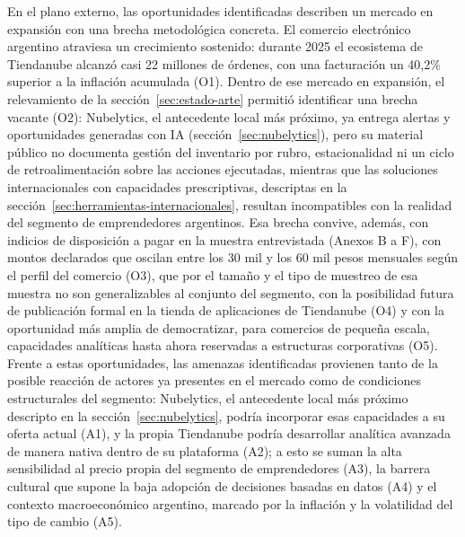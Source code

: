 En el plano externo, las oportunidades identificadas describen un mercado en expansión con una brecha metodológica concreta. El comercio electrónico argentino atraviesa un crecimiento sostenido: durante 2025 el ecosistema de Tiendanube alcanzó casi 22 millones de órdenes, con una facturación un 40,2\% superior a la inflación acumulada \parencite{Tiendanube2026} (O1). Dentro de ese mercado en expansión, el relevamiento de la sección~\ref{sec:estado-arte} permitió identificar una brecha vacante (O2): Nubelytics, el antecedente local más próximo, ya entrega alertas y oportunidades generadas con IA (sección~\ref{sec:nubelytics}), pero su material público no documenta gestión del inventario por rubro, estacionalidad ni un ciclo de retroalimentación sobre las acciones ejecutadas, mientras que las soluciones internacionales con capacidades prescriptivas, descriptas en la sección~\ref{sec:herramientas-internacionales}, resultan incompatibles con la realidad del segmento de emprendedores argentinos. Esa brecha convive, además, con indicios de disposición a pagar en la muestra entrevistada (Anexos B a F), con montos declarados que oscilan entre los 30 mil y los 60 mil pesos mensuales según el perfil del comercio (O3), que por el tamaño y el tipo de muestreo de esa muestra no son generalizables al conjunto del segmento, con la posibilidad futura de publicación formal en la tienda de aplicaciones de Tiendanube (O4) y con la oportunidad más amplia de democratizar, para comercios de pequeña escala, capacidades analíticas hasta ahora reservadas a estructuras corporativas (O5). Frente a estas oportunidades, las amenazas identificadas provienen tanto de la posible reacción de actores ya presentes en el mercado como de condiciones estructurales del segmento: Nubelytics, el antecedente local más próximo descripto en la sección~\ref{sec:nubelytics}, podría incorporar esas capacidades a su oferta actual (A1), y la propia Tiendanube podría desarrollar analítica avanzada de manera nativa dentro de su plataforma (A2); a esto se suman la alta sensibilidad al precio propia del segmento de emprendedores (A3), la barrera cultural que supone la baja adopción de decisiones basadas en datos (A4) y el contexto macroeconómico argentino, marcado por la inflación y la volatilidad del tipo de cambio (A5).

